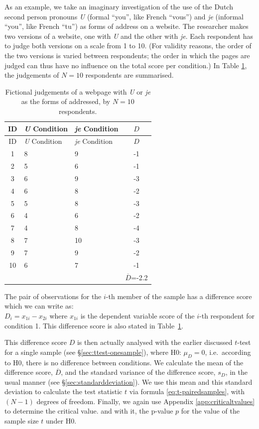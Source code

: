 \documentclass[
]{book}
\begin{document}
As an example, we take an imaginary investigation of the use of the
Dutch second person pronouns \emph{U} (formal ``you'', like French ``vous'') and \emph{je} (informal ``you'', like French ``tu'') as forms of address on a website. The researcher makes two versions
of a website, one with \emph{U} and the other with \emph{je}. Each
respondent has to judge both versions on a scale from 1 to 10. (For validity
reasons, the order of the two versions is varied between respondents;
the order in which the pages are judged can thus
have no influence on the total score per condition.) In Table
\ref{tab:data-uje-paired}, the judgements of \(N=10\)
respondents are summarised.

\begin{longtable}[]{@{}cllc@{}}
\caption{\label{tab:data-uje-paired} Fictional judgements of a webpage
with \emph{U} or \emph{je} as the forms of addressed, by \(N=10\) respondents.}\tabularnewline
\toprule
ID & \emph{U} Condition & \emph{je} Condition & \(D\)\tabularnewline
\midrule
\endfirsthead
\toprule
ID & \emph{U} Condition & \emph{je} Condition & \(D\)\tabularnewline
\midrule
\endhead
1 & 8 & 9 & -1\tabularnewline
2 & 5 & 6 & -1\tabularnewline
3 & 6 & 9 & -3\tabularnewline
4 & 6 & 8 & -2\tabularnewline
5 & 5 & 8 & -3\tabularnewline
6 & 4 & 6 & -2\tabularnewline
7 & 4 & 8 & -4\tabularnewline
8 & 7 & 10 & -3\tabularnewline
9 & 7 & 9 & -2\tabularnewline
10 & 6 & 7 & -1\tabularnewline
& & & \(\overline{D}\)=-2.2\tabularnewline
\bottomrule
\end{longtable}

The pair of observations for the \(i\)-th member of the sample has a
difference score which we can write as:\\
\(D_i = x_{1i} - x_{2i}\) where \(x_{1i}\) is the dependent
variable score of the \(i\)-th respondent for condition 1. This
difference score is also stated in
Table~\ref{tab:data-uje-paired}.

This difference score \(D\) is then actually analysed with the earlier discussed \(t\)-test for a single sample (see §\ref{sec:ttest-onesample}), where H0: \(\mu_D=0\), i.e.~according to H0, there is no
difference between conditions. We calculate the mean of the difference score,
\(\overline{D}\), and the standard variance of the difference score, \(s_{D}\),
in the usual manner (see
§\ref{sec:standarddeviation}). We use this mean and this
standard deviation to calculate the test statistic \(t\) via formula
\eqref{eq:t-pairedsamples}, with \((N-1)\) degrees of freedom. Finally,
we again use
Appendix \ref{app:criticaltvalues} to determine the critical value.
and with it, the p-value \(p\) for the value of the sample size
\(t\) under H0.
\end{document}
